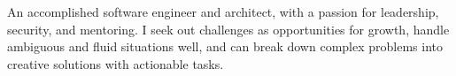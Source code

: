 An accomplished software engineer and architect, with a passion for leadership, security, and mentoring. I seek out
challenges as opportunities for growth, handle ambiguous and fluid situations well, and can break down complex problems
into creative solutions with actionable tasks.

